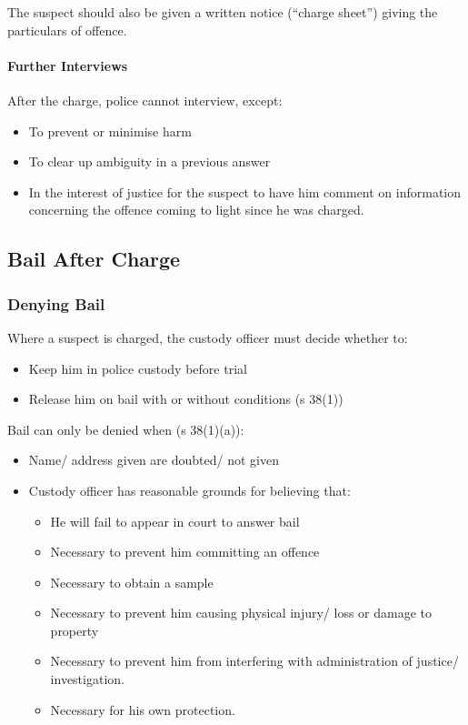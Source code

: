 \documentclass[
]{article}
\providecommand{\tightlist}{%
  \setlength{\itemsep}{0pt}\setlength{\parskip}{0pt}}
\begin{document}
The suspect should also be given a written notice (``charge sheet'')
giving the particulars of offence.

\hypertarget{further-interviews}{%
\paragraph{Further Interviews}\label{further-interviews}}

After the charge, police cannot interview, except:

\begin{itemize}
\tightlist
\item
  To prevent or minimise harm
\item
  To clear up ambiguity in a previous answer
\item
  In the interest of justice for the suspect to have him comment on
  information concerning the offence coming to light since he was
  charged.
\end{itemize}

\hypertarget{bail-after-charge}{%
\subsection{Bail After Charge}\label{bail-after-charge}}

\hypertarget{denying-bail}{%
\subsubsection{Denying Bail}\label{denying-bail}}

Where a suspect is charged, the custody officer must decide whether to:

\begin{itemize}
\tightlist
\item
  Keep him in police custody before trial
\item
  Release him on bail with or without conditions (s 38(1))
\end{itemize}

Bail can only be denied when (s 38(1)(a)):

\begin{itemize}
\tightlist
\item
  Name/ address given are doubted/ not given
\item
  Custody officer has reasonable grounds for believing that:

  \begin{itemize}
  \tightlist
  \item
    He will fail to appear in court to answer bail
  \item
    Necessary to prevent him committing an offence
  \item
    Necessary to obtain a sample
  \item
    Necessary to prevent him causing physical injury/ loss or damage to
    property
  \item
    Necessary to prevent him from interfering with administration of
    justice/ investigation.
  \item
    Necessary for his own protection.
  \end{itemize}
\end{itemize}
\end{document}
